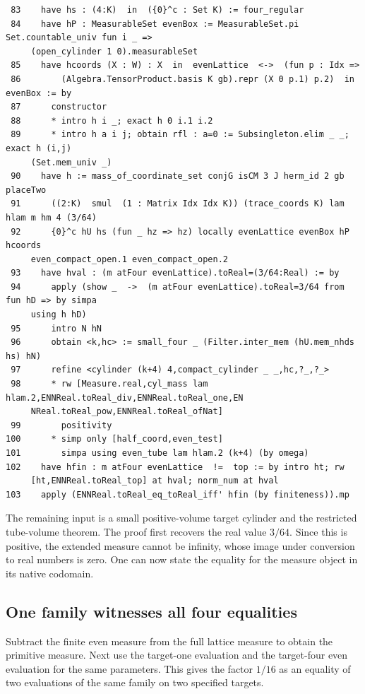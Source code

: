\documentclass[12pt,letterpaper]{article}
\begin{document}
\par
{\fontsize{9.2}{11.2}\selectfont\begin{verbatim}
 83    have hs : (4:K)  in  ({0}^c : Set K) := four_regular
 84    have hP : MeasurableSet evenBox := MeasurableSet.pi Set.countable_univ fun i _ =>
     (open_cylinder 1 0).measurableSet
 85    have hcoords (X : W) : X  in  evenLattice  <->  (fun p : Idx =>
 86        (Algebra.TensorProduct.basis K gb).repr (X 0 p.1) p.2)  in  evenBox := by
 87      constructor
 88      * intro h i _; exact h 0 i.1 i.2
 89      * intro h a i j; obtain rfl : a=0 := Subsingleton.elim _ _; exact h (i,j)
     (Set.mem_univ _)
 90    have h := mass_of_coordinate_set conjG isCM 3 J herm_id 2 gb placeTwo
 91      ((2:K)  smul  (1 : Matrix Idx Idx K)) (trace_coords K) lam hlam m hm 4 (3/64)
 92      {0}^c hU hs (fun _ hz => hz) locally evenLattice evenBox hP hcoords
     even_compact_open.1 even_compact_open.2
 93    have hval : (m atFour evenLattice).toReal=(3/64:Real) := by
 94      apply (show _  ->  (m atFour evenLattice).toReal=3/64 from fun hD => by simpa
     using h hD)
 95      intro N hN
 96      obtain <k,hc> := small_four _ (Filter.inter_mem (hU.mem_nhds hs) hN)
 97      refine <cylinder (k+4) 4,compact_cylinder _ _,hc,?_,?_>
 98      * rw [Measure.real,cyl_mass lam hlam.2,ENNReal.toReal_div,ENNReal.toReal_one,EN
     NReal.toReal_pow,ENNReal.toReal_ofNat]
 99        positivity
100      * simp only [half_coord,even_test]
101        simpa using even_tube lam hlam.2 (k+4) (by omega)
102    have hfin : m atFour evenLattice  !=  top := by intro ht; rw
     [ht,ENNReal.toReal_top] at hval; norm_num at hval
103    apply (ENNReal.toReal_eq_toReal_iff' hfin (by finiteness)).mp
\end{verbatim}}
The remaining input is a small positive-volume target cylinder and the restricted tube-volume theorem. The proof first recovers the real value $3/64$. Since this is positive, the extended measure cannot be infinity, whose image under conversion to real numbers is zero. One can now state the equality for the measure object in its native codomain.
\clearpage{}\subsection*{One family witnesses all four equalities}\label{extract-FourEndpoint106}
Subtract the finite even measure from the full lattice measure to obtain the primitive measure. Next use the target-one evaluation and the target-four even evaluation for the same parameters. This gives the factor $1/16$ as an equality of two evaluations of the same family on two specified targets.
\end{document}
